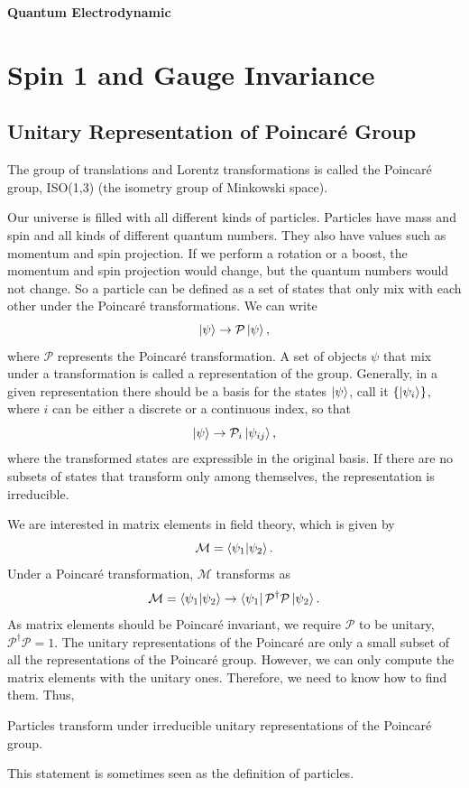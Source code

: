 \documentclass[11pt]{article}
\theoremstyle{definition}
\begin{document}
{\LARGE \bf Quantum Electrodynamic}
\section{Spin 1 and Gauge Invariance}
\subsection{Unitary Representation of Poincaré Group}
The group of translations and Lorentz transformations is called the Poincaré group, ISO(1,3) (the isometry group of Minkowski space).

Our universe is filled with all different kinds of particles. Particles have mass and spin and all kinds of different quantum numbers. They also have values such as momentum and spin projection. If we perform a rotation or a boost, the momentum and spin projection would change, but the quantum numbers would not change. So a particle can be defined as a set of states that only mix with each other under the Poincaré transformations. We can write
\begin{equation}
    \ket{\psi}\rightarrow \mathcal{P}\ket{\psi},
\end{equation}
where $\mathcal{P}$ represents the Poincaré transformation. A set of objects $\psi$ that mix under a transformation is called a representation of the group. Generally, in a given representation there should be a basis for the states $\ket{\psi}$, call it $\{\ket{\psi_i}\}$, where $i$ can be either a discrete or a continuous index, so that
\begin{equation}
    \ket{\psi}\rightarrow \mathcal{P}_i\ket{\psi_{ij}},
\end{equation}
where the transformed states are expressible in the original basis. If there are no subsets of states that transform only among themselves, the representation is irreducible.

We are interested in matrix elements in field theory, which is given by 
\begin{equation}
    \mathcal{M} = \braket{\psi_1}{\psi_2}.
\end{equation}
Under a Poincaré transformation, $\mathcal{M}$ transforms as 
\begin{equation}
    \mathcal{M} =  \braket{\psi_1}{\psi_2} \rightarrow  \bra{\psi_1}\mathcal{P}^\dagger\mathcal{P}\ket{\psi_2}.
\end{equation}
As matrix elements should be Poincaré invariant, we require $\mathcal{P}$ to be unitary, $\mathcal{P}^\dagger\mathcal{P} = 1$. The unitary representations of the Poincaré are only a small subset of all the representations of the Poincaré group. However, we can only compute the matrix elements with the unitary ones. Therefore, we need to know how to find them. Thus,
\begin{shaded}
    \begin{center}
        Particles transform under irreducible unitary representations of the Poincaré group.
    \end{center}
\end{shaded}
This statement is sometimes seen as the definition of particles. 
\end{document}
